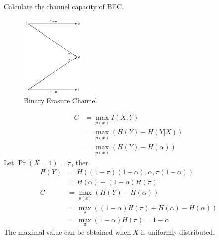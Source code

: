 \begin{exercise}[BSC]{Calculate the channel capacity of BEC.
  \begin{figure}[H]
    \centering
    \includegraphics[height=4cm]{img/6-2.png}
    \caption{Binary Erasure Channel}
    \label{fig:bec}
  \end{figure}}
  \begin{solution}
    \begin{equation}\begin{aligned}
      C &=\max _{p(x)} I(X ; Y) \\
      &=\max _{p(x)}(H(Y)-H(Y | X))\\
      &=\max _{p(x)} (H(Y)-H(\alpha))
      \end{aligned}\end{equation}
      Let $\Pr\left(X = 1\right) = \pi$, then
      \begin{equation}
        \begin{aligned}
          H(Y) &= H((1-\pi)(1-\alpha),\alpha,\pi(1-\alpha)) \\
          &= H(\alpha) + (1-\alpha)H(\pi) \\
          C &= \max_{p(x)} (H(Y)-H(\alpha)) \\
          &= \max_{\pi} ((1-\alpha)H(\pi)+H(\alpha)-H(\alpha)) \\
          &= \max_{\pi} (1-\alpha)H(\pi) = 1-\alpha
        \end{aligned}
      \end{equation}
      The maximal value can be obtained when $X$ is uniformly distributed.
  \end{solution}
  \label{ex6-2}
\end{exercise}


